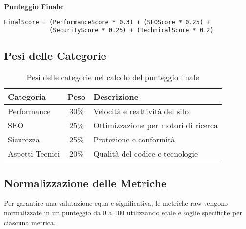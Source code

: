 \textbf{Punteggio Finale}:
\begin{verbatim}
FinalScore = (PerformanceScore * 0.3) + (SEOScore * 0.25) + 
             (SecurityScore * 0.25) + (TechnicalScore * 0.2)
\end{verbatim}

\subsection{Pesi delle Categorie}
\begin{table}[H]
\centering
\begin{tabular}{|l|c|l|}
\hline
\textbf{Categoria} & \textbf{Peso} & \textbf{Descrizione} \\
\hline
Performance & 30\% & Velocità e reattività del sito \\
\hline
SEO & 25\% & Ottimizzazione per motori di ricerca \\
\hline
Sicurezza & 25\% & Protezione e conformità \\
\hline
Aspetti Tecnici & 20\% & Qualità del codice e tecnologie \\
\hline
\end{tabular}
\caption{Pesi delle categorie nel calcolo del punteggio finale}
\label{table:category-weights}
\end{table}

\subsection{Normalizzazione delle Metriche}
Per garantire una valutazione equa e significativa, le metriche raw vengono normalizzate in un punteggio da 0 a 100 utilizzando scale e soglie specifiche per ciascuna metrica.

